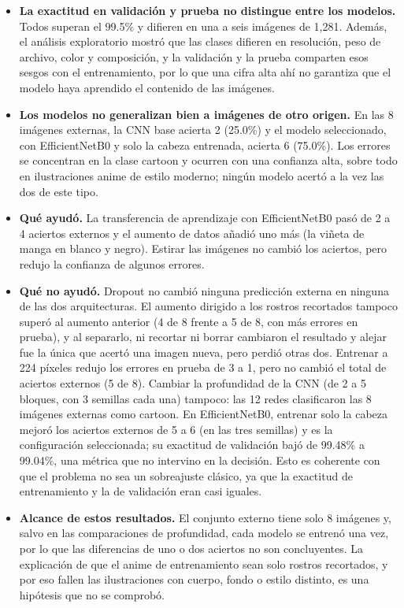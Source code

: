 \documentclass[letterpaper, 10 pt]{IEEEconf}
\begin{document}
\begin{itemize}
    \item \textbf{La exactitud en validación y prueba no distingue entre los modelos.} Todos superan el 99.5\% y difieren en una a seis imágenes de 1,281. Además, el análisis exploratorio mostró que las clases difieren en resolución, peso de archivo, color y composición, y la validación y la prueba comparten esos sesgos con el entrenamiento, por lo que una cifra alta ahí no garantiza que el modelo haya aprendido el contenido de las imágenes.
    \item \textbf{Los modelos no generalizan bien a imágenes de otro origen.} En las 8 imágenes externas, la CNN base acierta 2 (25.0\%) y el modelo seleccionado, con EfficientNetB0 y solo la cabeza entrenada, acierta 6 (75.0\%). Los errores se concentran en la clase cartoon y ocurren con una confianza alta, sobre todo en ilustraciones anime de estilo moderno; ningún modelo acertó a la vez las dos de este tipo.
    \item \textbf{Qué ayudó.} La transferencia de aprendizaje con EfficientNetB0 pasó de 2 a 4 aciertos externos y el aumento de datos añadió uno más (la viñeta de manga en blanco y negro). Estirar las imágenes no cambió los aciertos, pero redujo la confianza de algunos errores.
    \item \textbf{Qué no ayudó.} Dropout no cambió ninguna predicción externa en ninguna de las dos arquitecturas. El aumento dirigido a los rostros recortados tampoco superó al aumento anterior (4 de 8 frente a 5 de 8, con más errores en prueba), y al separarlo, ni recortar ni borrar cambiaron el resultado y alejar fue la única que acertó una imagen nueva, pero perdió otras dos. Entrenar a 224 píxeles redujo los errores en prueba de 3 a 1, pero no cambió el total de aciertos externos (5 de 8). Cambiar la profundidad de la CNN (de 2 a 5 bloques, con 3 semillas cada una) tampoco: las 12 redes clasificaron las 8 imágenes externas como cartoon. En EfficientNetB0, entrenar solo la cabeza mejoró los aciertos externos de 5 a 6 (en las tres semillas) y es la configuración seleccionada; su exactitud de validación bajó de 99.48\% a 99.04\%, una métrica que no intervino en la decisión. Esto es coherente con que el problema no sea un sobreajuste clásico, ya que la exactitud de entrenamiento y la de validación eran casi iguales.
    \item \textbf{Alcance de estos resultados.} El conjunto externo tiene solo 8 imágenes y, salvo en las comparaciones de profundidad, cada modelo se entrenó una vez, por lo que las diferencias de uno o dos aciertos no son concluyentes. La explicación de que el anime de entrenamiento sean solo rostros recortados, y por eso fallen las ilustraciones con cuerpo, fondo o estilo distinto, es una hipótesis que no se comprobó.
\end{itemize}
\end{document}
